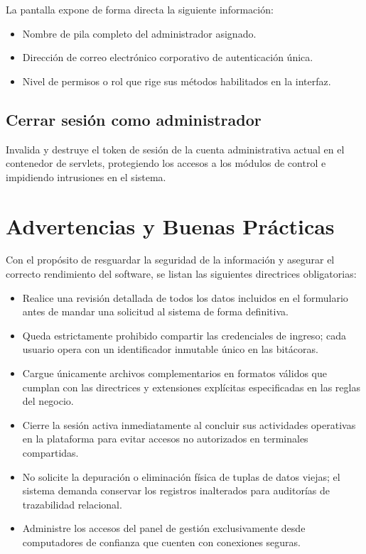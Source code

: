 \documentclass[12pt,letterpaper]{article}
\begin{document}
La pantalla expone de forma directa la siguiente información:
\begin{itemize}
    \item Nombre de pila completo del administrador asignado.
    \item Dirección de correo electrónico corporativo de autenticación única.
    \item Nivel de permisos o rol que rige sus métodos habilitados en la interfaz.
\end{itemize}

\subsection{Cerrar sesión como administrador}

Invalida y destruye el token de sesión de la cuenta administrativa actual en el contenedor de servlets, protegiendo los accesos a los módulos de control e impidiendo intrusiones en el sistema.

\section{Advertencias y Buenas Prácticas}

Con el propósito de resguardar la seguridad de la información y asegurar el correcto rendimiento del software, se listan las siguientes directrices obligatorias:
\begin{itemize}
    \item Realice una revisión detallada de todos los datos incluidos en el formulario antes de mandar una solicitud al sistema de forma definitiva.
    \item Queda estrictamente prohibido compartir las credenciales de ingreso; cada usuario opera con un identificador inmutable único en las bitácoras.
    \item Cargue únicamente archivos complementarios en formatos válidos que cumplan con las directrices y extensiones explícitas especificadas en las reglas del negocio.
    \item Cierre la sesión activa inmediatamente al concluir sus actividades operativas en la plataforma para evitar accesos no autorizados en terminales compartidas.
    \item No solicite la depuración o eliminación física de tuplas de datos viejas; el sistema demanda conservar los registros inalterados para auditorías de trazabilidad relacional.
    \item Administre los accesos del panel de gestión exclusivamente desde computadores de confianza que cuenten con conexiones seguras.
\end{itemize}
\end{document}
